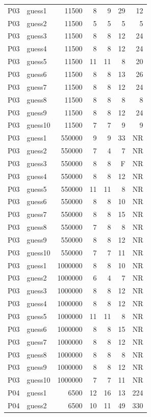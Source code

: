 {\begin{longtable}{llrrrrr}
P03 & guess1 & 11500 & 8 & 9 & 29 & 12 \\
P03 & guess2 & 11500 & 5 & 5 & 5 & 5 \\
P03 & guess3 & 11500 & 8 & 8 & 12 & 24 \\
P03 & guess4 & 11500 & 8 & 8 & 12 & 24 \\
P03 & guess5 & 11500 & 11 & 11 & 8 & 20 \\
P03 & guess6 & 11500 & 8 & 8 & 13 & 26 \\
P03 & guess7 & 11500 & 8 & 8 & 12 & 24 \\
P03 & guess8 & 11500 & 8 & 8 & 8 & 8 \\
P03 & guess9 & 11500 & 8 & 8 & 12 & 24 \\
P03 & guess10 & 11500 & 7 & 7 & 9 & 9 \\
P03 & guess1 & 550000 & 9 & 9 & 33 & NR \\
P03 & guess2 & 550000 & 7 & 4 & 7 & NR \\
P03 & guess3 & 550000 & 8 & 8 & F & NR \\
P03 & guess4 & 550000 & 8 & 8 & 12 & NR \\
P03 & guess5 & 550000 & 11 & 11 & 8 & NR \\
P03 & guess6 & 550000 & 8 & 8 & 10 & NR \\
P03 & guess7 & 550000 & 8 & 8 & 15 & NR \\
P03 & guess8 & 550000 & 7 & 8 & 8 & NR \\
P03 & guess9 & 550000 & 8 & 8 & 12 & NR \\
P03 & guess10 & 550000 & 7 & 7 & 11 & NR \\
P03 & guess1 & 1000000 & 8 & 8 & 10 & NR \\
P03 & guess2 & 1000000 & 6 & 4 & 7 & NR \\
P03 & guess3 & 1000000 & 8 & 8 & 12 & NR \\
P03 & guess4 & 1000000 & 8 & 8 & 12 & NR \\
P03 & guess5 & 1000000 & 11 & 11 & 8 & NR \\
P03 & guess6 & 1000000 & 8 & 8 & 15 & NR \\
P03 & guess7 & 1000000 & 8 & 8 & 12 & NR \\
P03 & guess8 & 1000000 & 8 & 8 & 8 & NR \\
P03 & guess9 & 1000000 & 8 & 8 & 12 & NR \\
P03 & guess10 & 1000000 & 7 & 7 & 11 & NR \\
P04 & guess1 & 6500 & 12 & 16 & 13 & 224 \\
P04 & guess2 & 6500 & 10 & 11 & 49 & 330 \\

\end{longtable}}
